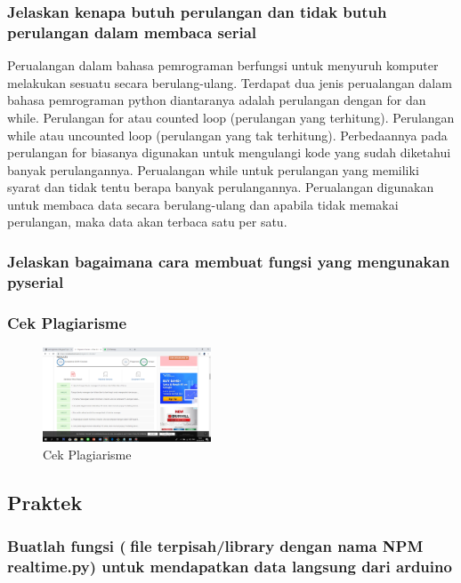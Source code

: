 \subsubsection{Jelaskan kenapa butuh perulangan dan tidak butuh perulangan dalam membaca serial}
Perualangan dalam bahasa pemrograman berfungsi untuk menyuruh komputer melakukan sesuatu secara berulang-ulang. Terdapat dua jenis perualangan dalam bahasa pemrograman python diantaranya adalah perulangan dengan for dan while.
Perulangan for atau counted loop (perulangan yang terhitung). Perulangan while atau uncounted loop (perulangan yang tak terhitung). Perbedaannya pada perulangan for biasanya digunakan untuk mengulangi kode yang sudah diketahui banyak perulangannya. Perualangan while untuk perulangan yang memiliki syarat dan tidak tentu berapa banyak perulangannya.
Perualangan digunakan untuk membaca data secara berulang-ulang  dan apabila tidak memakai perulangan, maka data akan terbaca satu per satu.

\subsubsection{Jelaskan bagaimana cara membuat fungsi yang mengunakan pyserial}


\subsubsection{Cek Plagiarisme}
\begin{figure}[H]	
    \includegraphics[width=5cm]{figures/5/1174008/teori/ssplagiatchapter5.png}
    \centering
    \caption{Cek Plagiarisme}
\end{figure}

\subsection{Praktek}
\subsubsection{Buatlah fungsi (file terpisah/library dengan nama NPM realtime.py) untuk mendapatkan data langsung dari arduino}


